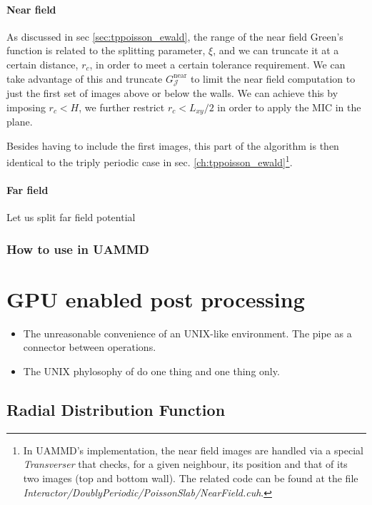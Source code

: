 \documentclass[ twoside,openright,titlepage,numbers=noenddot,%
headinclude,footinclude,cleardoublepage=empty,abstract=on,
BCOR=5mm,paper=a4,fontsize=11pt, dvipsnames
]{scrreprt}
\newcommand{\oper}[1]{\mathcal{#1}}
\newcommand{\uammd}{\gls{UAMMD}\xspace}
\newcommand{\near}{\textrm{near}}
\begin{document}
\subsection{Near field}
As discussed in sec \ref{sec:tppoisson_ewald}, the range of the near field Green's function is related to the splitting parameter, $\xi$, and we can truncate it at a certain distance, $r_{c}$, in order to meet a certain tolerance requirement. We can take advantage of this and truncate $G_{\oper{J}}^{\near}$ to limit the near field computation to just the first set of images above or below the walls. We can achieve this by imposing $r_c<H$, we further restrict $r_c < L_{xy}/2$ in order to apply the \gls{MIC} in the plane.

Besides having to include the first images, this part of the algorithm is then identical to the triply periodic case in sec. \ref{ch:tppoisson_ewald}\footnote{In \uammd's implementation, the near field images are handled via a special \emph{Transverser} that checks, for a given neighbour, its position and that of its two images (top and bottom wall). The related code can be found at the file \emph{Interactor/DoublyPeriodic/PoissonSlab/NearField.cuh}.}.
\subsection{Far field}

Let us split far field potential

\section{How to use in UAMMD}
\newpage
\cleardoublepage
{}
\part{GPU enabled post processing}\label{pt:tools}

\begin{itemize}
\item The unreasonable convenience of an UNIX-like environment. The pipe as a connector between operations.
\item The UNIX phylosophy of do one thing and one thing only.
\end{itemize}

\chapter{Radial Distribution Function}
\end{document}
